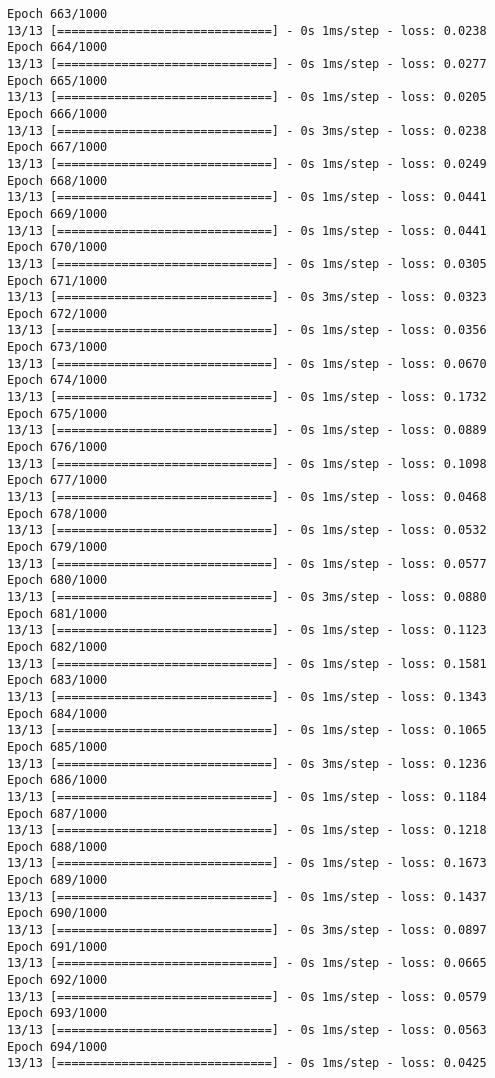 \documentclass[11pt]{article}
\begin{document}
\begin{Verbatim}[commandchars=\\\{\}]
Epoch 663/1000
13/13 [==============================] - 0s 1ms/step - loss: 0.0238
Epoch 664/1000
13/13 [==============================] - 0s 1ms/step - loss: 0.0277
Epoch 665/1000
13/13 [==============================] - 0s 1ms/step - loss: 0.0205
Epoch 666/1000
13/13 [==============================] - 0s 3ms/step - loss: 0.0238
Epoch 667/1000
13/13 [==============================] - 0s 1ms/step - loss: 0.0249
Epoch 668/1000
13/13 [==============================] - 0s 1ms/step - loss: 0.0441
Epoch 669/1000
13/13 [==============================] - 0s 1ms/step - loss: 0.0441
Epoch 670/1000
13/13 [==============================] - 0s 1ms/step - loss: 0.0305
Epoch 671/1000
13/13 [==============================] - 0s 3ms/step - loss: 0.0323
Epoch 672/1000
13/13 [==============================] - 0s 1ms/step - loss: 0.0356
Epoch 673/1000
13/13 [==============================] - 0s 1ms/step - loss: 0.0670
Epoch 674/1000
13/13 [==============================] - 0s 1ms/step - loss: 0.1732
Epoch 675/1000
13/13 [==============================] - 0s 1ms/step - loss: 0.0889
Epoch 676/1000
13/13 [==============================] - 0s 1ms/step - loss: 0.1098
Epoch 677/1000
13/13 [==============================] - 0s 1ms/step - loss: 0.0468
Epoch 678/1000
13/13 [==============================] - 0s 1ms/step - loss: 0.0532
Epoch 679/1000
13/13 [==============================] - 0s 1ms/step - loss: 0.0577
Epoch 680/1000
13/13 [==============================] - 0s 3ms/step - loss: 0.0880
Epoch 681/1000
13/13 [==============================] - 0s 1ms/step - loss: 0.1123
Epoch 682/1000
13/13 [==============================] - 0s 1ms/step - loss: 0.1581
Epoch 683/1000
13/13 [==============================] - 0s 1ms/step - loss: 0.1343
Epoch 684/1000
13/13 [==============================] - 0s 1ms/step - loss: 0.1065
Epoch 685/1000
13/13 [==============================] - 0s 3ms/step - loss: 0.1236
Epoch 686/1000
13/13 [==============================] - 0s 1ms/step - loss: 0.1184
Epoch 687/1000
13/13 [==============================] - 0s 1ms/step - loss: 0.1218
Epoch 688/1000
13/13 [==============================] - 0s 1ms/step - loss: 0.1673
Epoch 689/1000
13/13 [==============================] - 0s 1ms/step - loss: 0.1437
Epoch 690/1000
13/13 [==============================] - 0s 3ms/step - loss: 0.0897
Epoch 691/1000
13/13 [==============================] - 0s 1ms/step - loss: 0.0665
Epoch 692/1000
13/13 [==============================] - 0s 1ms/step - loss: 0.0579
Epoch 693/1000
13/13 [==============================] - 0s 1ms/step - loss: 0.0563
Epoch 694/1000
13/13 [==============================] - 0s 1ms/step - loss: 0.0425

\end{Verbatim}
\end{document}
